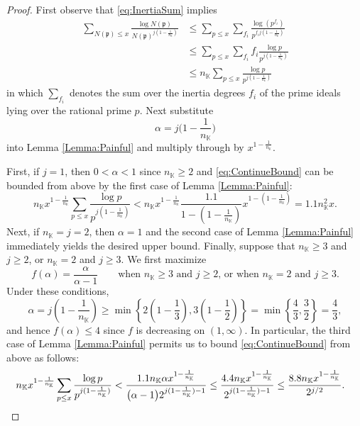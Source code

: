 \documentclass[10pt,reqno]{amsart}
\theoremstyle{plain}
\theoremstyle{definition}
\newcommand{\K}{\mathbb{K}}
\newcommand{\PP}{\mathfrak{p}}
\begin{document}
\begin{proof}
First observe that \eqref{eq:InertiaSum} implies
\begin{align}
\sum_{N(\PP)\leq x} \frac{\log N(\PP)}{N(\PP)^{j (1- \frac{1}{n_{\K}})}}
&\leq \sum_{p\leq x} \sum_{f_i} \frac{\log (p^{f_i}) }{ p^{f_i j (1- \frac{1}{n_{\K}} )} }  \nonumber \\
&\leq \sum_{p\leq x} \sum_{f_i} f_i \frac{\log p }{ p^{j (1- \frac{1}{n_{\K}}) } }  \nonumber \\
&\leq n_{\K} \sum_{p\leq x}\frac{\log p }{ p^{j (1- \frac{1}{n_{\K}}) } } \label{eq:ContinueBound}
 \end{align}
in which $\sum_{f_i}$ denotes the sum over the inertia degrees $f_i$ of the prime ideals lying over the
rational prime $p$. Next substitute 
\begin{equation*}
\alpha = j  \bigg(1- \frac{1}{n_{\K}} \bigg)
\end{equation*}
into Lemma \ref{Lemma:Painful}
and multiply through by $x^{1 - \frac{1}{n_{\K}}}$.

First, if $j =1$, then $0 < \alpha < 1$ since $n_{\K}\geq 2$ and \eqref{eq:ContinueBound} can be bounded from above by the first case of Lemma \ref{Lemma:Painful}:
\begin{equation*}
n_{\K} x^{1 - \frac{1}{n_{\K}}} \sum_{p\leq x} \frac{\log p}{p^{j (1- \frac{1}{n_{\K}})}}
< n_{\K}  x^{1 - \frac{1}{n_{\K}}} \frac{1.1}{1 - (1- \frac{1}{n_{\K}})} x^{1 - (1- \frac{1}{n_{\K}})}
= 1.1 n_{\K}^2x.
\end{equation*}
Next, if $n_{\K} = j  = 2$, then $\alpha = 1$ and the second case of Lemma \ref{Lemma:Painful} immediately yields the desired upper bound.
Finally, suppose that $n_{\K} \geq 3$ and $j  \geq 2$, or $n_{\K} =2$ and $j  \geq 3$. We first maximize
\begin{equation*}
f(\alpha) = \frac{\alpha}{\alpha -1}
\qquad \text{when $n_{\K} \geq 3$ and $j  \geq 2$, or when $n_{\K} =2$ and $j  \geq 3$}.
\end{equation*}
Under these conditions, 
\begin{equation*}
\alpha= j \left(1 - \frac{1}{n_{\K}} \right) \geq \min\left\{ 2\left(1 - \frac{1}{3}\right), 3\left(1- \frac{1}{2}\right) \right\} = \min\left\{\frac{4}{3}, \frac{3}{2} \right\} = \frac{4}{3},
\end{equation*}
and hence $f(\alpha) \leq 4$ since $f$ is decreasing on $(1,\infty)$.
In particular, the third case of Lemma \ref{Lemma:Painful} permits us to bound \eqref{eq:ContinueBound}
from above as follows:
\begin{align*}
n_{\K}x^{1 - \frac{1}{n_{\K}}} \sum_{p\leq x} \frac{\log p}{p^{j (1- \frac{1}{n_{\K}})}} < \dfrac{1.1n_{\K} \alpha x^{1 - \frac{1}{n_{\K}}}}{ \big(\alpha - 1 \big)2^{j (1- \frac{1}{n_{\K}})-1}} 
&\leq \dfrac{4.4n_{\K}x^{1 - \frac{1}{n_{\K}}}}{ 2^{j (1- \frac{1}{n_{\K}})-1}} 
\leq \frac{8.8n_{\K} x^{1 - \frac{1}{n_{\K}}} }{2^{j /2}}. \qedhere
\end{align*}
\end{proof}
\end{document}
